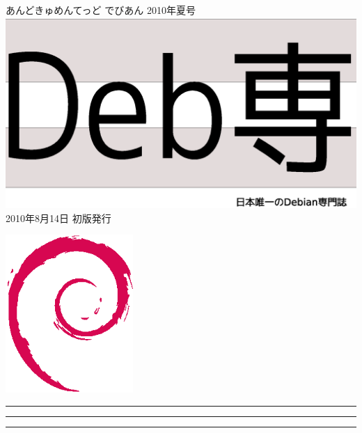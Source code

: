\documentclass[mingoth,a4paper]{jsarticle}
\begin{document}
\begin{titlepage}
\thispagestyle{empty}

\vspace*{-2cm}
あんどきゅめんてっど でびあん 2010年夏号\\
\hspace*{-2cm}
\includegraphics[width=210mm]{image2010-natsu/debsen.eps}\\
\hfill 2010年8月14日 初版発行



\vspace*{-2cm}
\hfill{}\includegraphics[height=6cm]{image200502/openlogo-nd.eps}
\end{titlepage}

\newpage
\begin{minipage}[]{0.2\hsize}
 \colorbox{dancerlightblue}{}
\end{minipage}
\begin{minipage}[]{0.8\hsize}
\hrule
\vspace{1mm}
\hrule
\setcounter{tocdepth}{1}
{\small
 \tableofcontents}
\vspace{1mm}
\hrule
\vspace{3cm}

\end{minipage}
\end{document}
